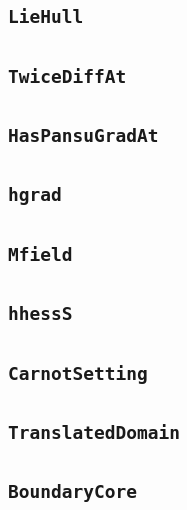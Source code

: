 \documentclass[11pt]{amsart}
\theoremstyle{definition}
\begin{document}
\subsection{\texorpdfstring{\texttt{LieHull}}{LieHull}}\label{node:LieHull}


\subsection{\texorpdfstring{\texttt{TwiceDiffAt}}{TwiceDiffAt}}\label{node:TwiceDiffAt}


\subsection{\texorpdfstring{\texttt{HasPansuGradAt}}{HasPansuGradAt}}\label{node:HasPansuGradAt}


\subsection{\texorpdfstring{\texttt{hgrad}}{hgrad}}\label{node:hgrad}


\subsection{\texorpdfstring{\texttt{Mfield}}{Mfield}}\label{node:Mfield}


\subsection{\texorpdfstring{\texttt{hhessS}}{hhessS}}\label{node:hhessS}


\subsection{\texorpdfstring{\texttt{CarnotSetting}}{CarnotSetting}}\label{node:CarnotSetting}


\subsection{\texorpdfstring{\texttt{TranslatedDomain}}{TranslatedDomain}}\label{node:TranslatedDomain}


\subsection{\texorpdfstring{\texttt{BoundaryCore}}{BoundaryCore}}\label{node:BoundaryCore}

\end{document}
